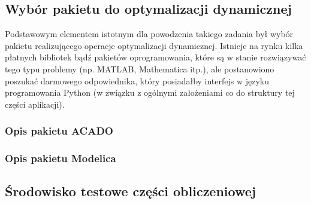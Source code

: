 \subsection{Wybór pakietu do optymalizacji dynamicznej}
\label{sub:czesc-wyzsza-wybor}

Podstawowym elementem istotnym dla powodzenia takiego zadania był wybór pakietu realizującego operacje optymalizacji dynamicznej. Istnieje na rynku kilka płatnych bibliotek bądź pakietów oprogramowania, które są w stanie rozwiązywać tego typu problemy (np. MATLAB, Mathematica itp.), ale postanowiono poszukać darmowego odpowiednika, który posiadałby interfejs w języku programowania Python (w związku z ogólnymi założeniami co do struktury tej części aplikacji).


\subsubsection{Opis pakietu ACADO}


\subsubsection{Opis pakietu Modelica}


\subsection{Środowisko testowe części obliczeniowej}
\label{sub:czesc-wyzsza-docker}